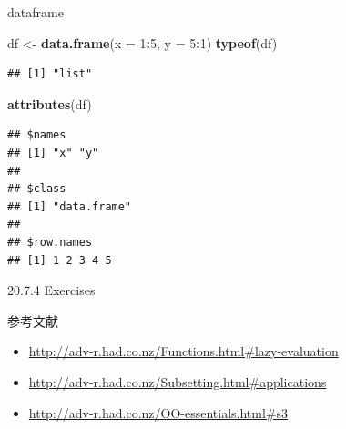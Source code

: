 \documentclass[ignorenonframetext,]{beamer}
\newenvironment{Shaded}{\begin{snugshade}}{\end{snugshade}}
\newcommand{\KeywordTok}[1]{\textcolor[rgb]{0.13,0.29,0.53}{\textbf{#1}}}
\newcommand{\DataTypeTok}[1]{\textcolor[rgb]{0.13,0.29,0.53}{#1}}
\newcommand{\DecValTok}[1]{\textcolor[rgb]{0.00,0.00,0.81}{#1}}
\newcommand{\StringTok}[1]{\textcolor[rgb]{0.31,0.60,0.02}{#1}}
\newcommand{\OperatorTok}[1]{\textcolor[rgb]{0.81,0.36,0.00}{\textbf{#1}}}
\newcommand{\NormalTok}[1]{#1}
\providecommand{\tightlist}{%
  \setlength{\itemsep}{0pt}\setlength{\parskip}{0pt}}
\begin{document}
\begin{frame}[fragile]{dataframe}

\begin{Shaded}
\begin{Highlighting}[]
\NormalTok{df <-}\StringTok{ }\KeywordTok{data.frame}\NormalTok{(}\DataTypeTok{x =} \DecValTok{1}\OperatorTok{:}\DecValTok{5}\NormalTok{, }\DataTypeTok{y =} \DecValTok{5}\OperatorTok{:}\DecValTok{1}\NormalTok{)}
\KeywordTok{typeof}\NormalTok{(df)}
\end{Highlighting}
\end{Shaded}

\begin{verbatim}
## [1] "list"
\end{verbatim}

\begin{Shaded}
\begin{Highlighting}[]
\KeywordTok{attributes}\NormalTok{(df)}
\end{Highlighting}
\end{Shaded}

\begin{verbatim}
## $names
## [1] "x" "y"
## 
## $class
## [1] "data.frame"
## 
## $row.names
## [1] 1 2 3 4 5
\end{verbatim}

\end{frame}

\begin{frame}{20.7.4 Exercises}

\end{frame}

\begin{frame}{参考文献}

\begin{itemize}
\tightlist
\item
  \url{http://adv-r.had.co.nz/Functions.html\#lazy-evaluation}
\item
  \url{http://adv-r.had.co.nz/Subsetting.html\#applications}
\item
  \url{http://adv-r.had.co.nz/OO-essentials.html\#s3}
\end{itemize}

\end{frame}
\end{document}
